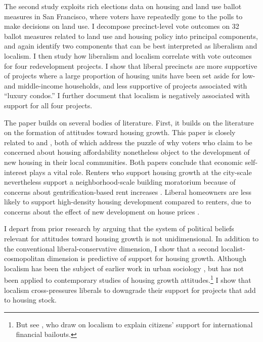 \documentclass[article,11pt]{memoir}
\begin{document}
The second study exploits rich elections data on housing and land use ballot measures in San Francisco, where voters have repeatedly gone to the polls to make decisions on land use. I decompose precinct-level vote outcomes on 32 ballot measures related to land use and housing policy into principal components, and again identify two components that can be best interpreted as liberalism and localism. I then study how liberalism and localism correlate with vote outcomes for four redevelopment projects. I show that liberal precincts are more supportive of projects where a large proportion of housing units have been set aside for low- and middle-income households, and less supportive of projects associated with ``luxury condos.''  I further document that localism is negatively associated with support for all four projects.

The paper builds on several bodies of literature. First, it builds on the literature on the formation of attitudes toward housing growth.  This paper is closely related to \cite{marble_where_2018} and \cite{hankinson_when_2018}, both of which address the puzzle of why voters who claim to be concerned about housing affordability nonetheless object to the development of new housing in their local communities. Both papers conclude that economic self-interest plays a vital role. Renters who support housing growth at the city-scale nevertheless support a neighborhood-scale building moratorium because of concerns about gentrification-based rent increases \citep{hankinson_when_2018}. Liberal homeowners are less likely to support high-density housing development compared to renters, due to concerns about the effect of new development on house prices \citep{marble_where_2018}.  

I depart from prior research by arguing that the system of political beliefs relevant for attitudes toward housing growth is not unidimensional. In addition to the conventional liberal-conservative dimension, I show that a second localist-cosmopolitan dimension is predictive of support for housing growth.  Although localism has been the subject of earlier work in urban sociology \citep[e.g.][]{dye_local-cosmopolitan_1963-1}, but has not been applied to contemporary studies of housing growth attitudes.\footnote{But see \cite{bechtel_preferences_2014}, who draw on localism to explain citizens' support for international financial bailouts.} I show that localism cross-pressures liberals to downgrade their support for projects that add to housing stock.

\end{document}
